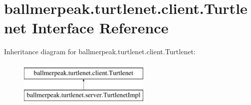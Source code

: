 \hypertarget{interfaceballmerpeak_1_1turtlenet_1_1client_1_1Turtlenet}{\section{ballmerpeak.\-turtlenet.\-client.\-Turtlenet Interface Reference}
\label{interfaceballmerpeak_1_1turtlenet_1_1client_1_1Turtlenet}
}
Inheritance diagram for ballmerpeak.\-turtlenet.\-client.\-Turtlenet\-:\begin{figure}[H]
\begin{center}
\leavevmode
\includegraphics[height=2.000000cm]{interfaceballmerpeak_1_1turtlenet_1_1client_1_1Turtlenet}
\end{center}
\end{figure}
